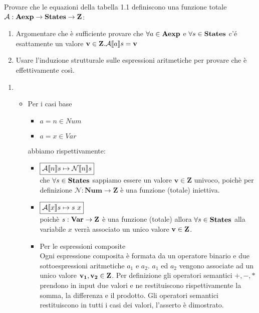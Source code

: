 {Provare che le equazioni della tabella 1.1 definiscono una funzione totale 
$\mathcal{A}:\mbox{\textbf{Aexp}} \rightarrow \mbox{\textbf{States}} \rightarrow \mbox{\textbf{Z}}$: 
	\begin{enumerate}
		\item Argomentare che è sufficiente provare che  
$\forall a \in \mbox{\textbf{Aexp}}$ e $\forall s \in \mbox{\textbf{States}}$
		c'é esattamente un valore $\mathbf{v} \in \mathbf{Z}.\mathcal{A} \llbracket a \rrbracket s = 
\mathbf{v}$
		\item Usare l'induzione strutturale sulle espressioni 
aritmetiche per provare che è effettivamente così.
	\end{enumerate}
}
{
	\begin{enumerate}
		\item 
                \begin{itemize}
                  \item Per i casi base
                    \begin{itemize}
                            \item $\boxed{a = n \in Num}$
                            \item $\boxed{a = x \in Var}$
                    \end{itemize} 
                    abbiamo rispettivamente:
                    \begin{itemize}
                            \item $\boxed{\mathcal{A} \llbracket n \rrbracket s \mapsto \mathcal{N} \llbracket n \rrbracket s}$ \\
                              che $\forall s \in \mbox{\textbf{States}}$ sappiamo essere un 
                              valore $\mathbf{v} \in \mathbf{Z}$ univoco, poichè 
                              per definizione $\mathcal{N}:\mathbf{Num} 
                              \rightarrow \mathbf{Z}$ è una funzione (totale) 
                              iniettiva.
                            \item $\boxed{\mathcal{A} \llbracket x \rrbracket s \mapsto s\mbox{ } x}$ \\
                              poichè $s:\mbox{\textbf{Var}} \rightarrow \mbox{\textbf{Z}}$ è una funzione 
                              (totale) allora $\forall s \in \mbox{\textbf{States}}$ 
                              alla variabile $x$ verrà associato un unico valore 
                              $\mathbf{v} \in \mbox{\textbf{Z}}$.
			
		  \item Per le espressioni composite \\
                        Ogni espressione composita è formata da un operatore 
                        binario e due sottoespressioni aritmetiche $a_1$ e 
                        $a_2$. $a_1$ ed $a_2$ vengono associate ad un unico 
                        valore $\mathbf{v_1}, \mathbf{v_2} \in \mbox{\textbf{Z}}$.
			Per definizione gli operatori semantici $+, -, *$ 
                        prendono in input due valori e ne restituiscono 
                        rispettivamente la somma, la differenza e il prodotto. 
                        Gli operatori semantici restituiscono in tutti i
                        casi dei valori, l'asserto è dimostrato.
	        \end{itemize}	
			

\end{itemize}
\end{enumerate}}
